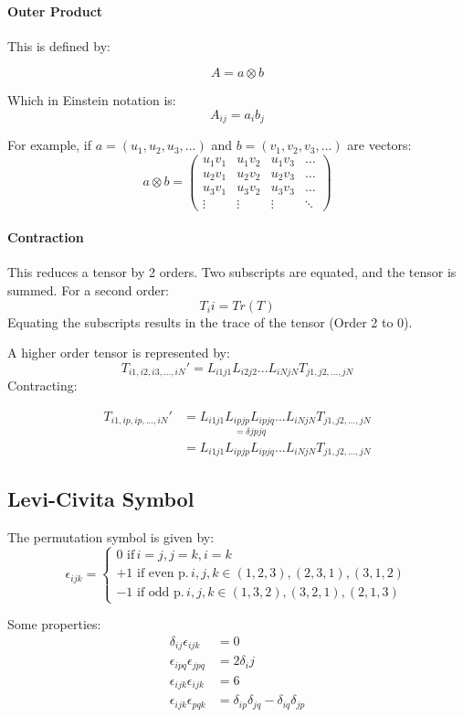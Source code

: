 \documentclass[12pt]{article}
\begin{document}
\paragraph{Outer Product}
This is defined by:

\[ A = a\otimes b\]

Which in Einstein notation is:
\[ A_{ij} = a_i b_j\]

For example, if $a = (u_1,u_2,u_3,...)$ and $b = (v_1,v_2,v_3,...)$ are vectors:
\[
a\otimes b = 
\begin{pmatrix}
u_1v_1&u_1v_2&u_1v_3&\dots\\
u_2v_1&u_2v_2&u_2v_3&\dots\\
u_3v_1&u_3v_2&u_3v_3&\dots\\
\vdots&\vdots&\vdots&\ddots
\end{pmatrix}
\]

\paragraph{Contraction} This reduces a tensor by 2 orders. Two subscripts are equated, and the tensor is summed. For a second order:
\[T_ii = Tr(T)\]
Equating the subscripts results in the trace of the tensor (Order 2 to 0).

A higher order tensor is represented by:
\[T_{i1,i2,i3,...,iN}' = L_{i1j1}L_{i2j2}...L_{iNjN}T_{j1,j2,...,jN}\]
Contracting:

\begin{align*}
T_{i1,ip,ip,...,iN}' &= L_{i1j1}\underset{=\delta{jpjq}}{L_{ipjp}L_{ipjq}}...L_{iNjN}T_{j1,j2,...,jN}\\
&=L_{i1j1}L_{ipjp}L_{ipjq}...L_{iNjN}T_{j1,j2,...,jN}
\end{align*}


\subsection{Levi-Civita Symbol}
The permutation symbol is given by:
\[
\epsilon_{ijk} =
\begin{cases}
0 \text{ if} \, i=j,j=k,i=k\\
+1 \text{ if even p.} \,i,j,k\in (1,2,3),(2,3,1),(3,1,2) \\
-1 \text{ if odd p.} \, i,j,k\in(1,3,2),(3,2,1),(2,1,3)
\end{cases}
\]

Some properties:
\begin{align*}
    \delta_{ij}\epsilon_{ijk} &= 0\\
    \epsilon_{ipq}\epsilon_{jpq} &= 2\delta_ij\\
    \epsilon_{ijk}\epsilon_{ijk} &= 6\\
    \epsilon_{ijk}\epsilon_{pqk} &= \delta_{ip}\delta_{jq} - \delta_{iq}\delta_{jp}
\end{align*}
\end{document}
